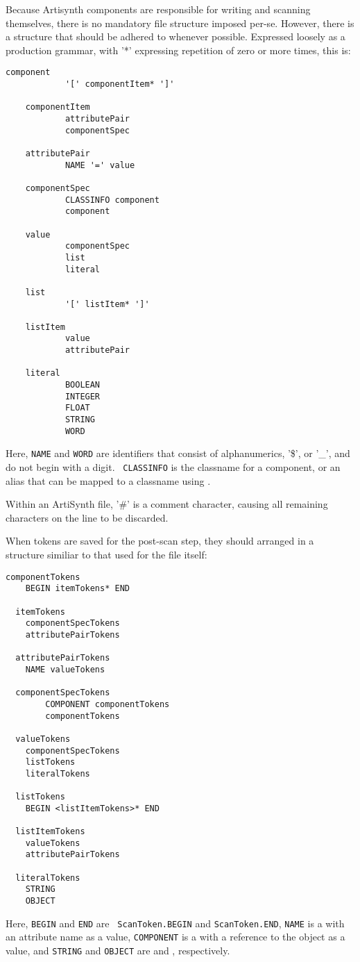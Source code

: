 \documentclass{article}
\begin{document}
Because Artisynth components are responsible for writing and scanning
themselves, there is no mandatory file structure imposed per-se.
However, there is a structure that should be adhered to whenever
possible. Expressed loosely as a production grammar, with '*'
expressing repetition of zero or more times, this is:
\begin{lstlisting}[]
    component
            '[' componentItem* ']'
    
    componentItem
            attributePair
            componentSpec
    
    attributePair
            NAME '=' value
    
    componentSpec
            CLASSINFO component
            component
    
    value
            componentSpec
            list
            literal
    
    list
            '[' listItem* ']'
    
    listItem
            value
            attributePair
    
    literal
            BOOLEAN
            INTEGER
            FLOAT
            STRING
            WORD
\end{lstlisting}
Here, {\tt NAME} and {\tt WORD} are identifiers that consist of
alphanumerics, '\$', or '\_', and do not begin with a digit. {\tt
CLASSINFO} is the classname for a component, or an alias that can be
mapped to a classname using
.

Within an ArtiSynth file, '\#' is a comment character, causing all
remaining characters on the line to be discarded.

When tokens are saved for the post-scan step, they 
should arranged in a structure similiar to that used
for the file itself:
\begin{lstlisting}[]
  componentTokens
	BEGIN itemTokens* END

  itemTokens
	componentSpecTokens
	attributePairTokens

  attributePairTokens
	NAME valueTokens

  componentSpecTokens
        COMPONENT componentTokens
        componentTokens

  valueTokens
	componentSpecTokens
	listTokens
	literalTokens

  listTokens
	BEGIN <listItemTokens>* END

  listItemTokens
	valueTokens
	attributePairTokens

  literalTokens
	STRING
	OBJECT
\end{lstlisting}
Here, {\tt BEGIN} and {\tt END} are {\tt
ScanToken.BEGIN} and {\tt ScanToken.END}, {\tt NAME} is a
 with an attribute name as
a value, {\tt COMPONENT} is a
 with a reference to the
object as a value, and {\tt STRING} and {\tt OBJECT} are
 and
, respectively.
\end{document}
